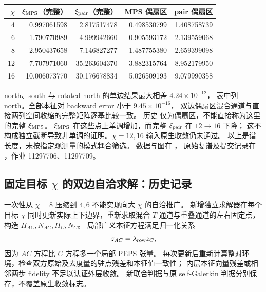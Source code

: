 \documentclass[11pt]{article}
\begin{document}
\begin{center}
\begin{tabular}{rrrrr}
\toprule
$\chi$ & $\xi_{\rm MPS}$（完整） & $\xi_{\rm pair}$（完整） & MPS 偶扇区 & pair 偶扇区\\
\midrule
4  & 0.997061598 & 2.817517478 & 0.498530799 & 1.408758739\\
6  & 1.790770989 & 4.999942660 & 0.905593172 & 2.139559068\\
8  & 2.950437658 & 7.146827277 & 1.487755380 & 2.659399098\\
12 & 7.707971060 & 35.263604370 & 3.882315764 & 8.952179950\\
16 & 10.006073770 & 30.176678834 & 5.026509193 & 9.079990358\\
\bottomrule
\end{tabular}
\end{center}
north、south 与 rotated-north 的单边结果最大相差 $4.24\times10^{-12}$，
表中列 north。全部本征对 backward error 小于 $9.45\times10^{-16}$，
双边偶扇区混合通道与直接两列空间收缩的完整矩阵逐基比较一致。
历史  仅为偶扇区，不能直接称为这里的完整 $\xi_{\rm MPS}$。
$\xi_{\rm MPS}$ 在这些点上单调增加，而完整 $\xi_{\rm pair}$ 在 $12\to16$ 下降；
这不构成独立截断导致非单调的证明。$\chi=12,16$ 输入原生收敛仍未通过。
以上是谱长度，未按指定观测量的模式耦合筛选。
数据与图在 ，
原始复谱及提交记录在 ，作业 11297706、11297709。




\subsection{固定目标 $\chi$ 的双边自洽求解：历史记录}

一次性从 $\chi=8$ 压缩到 $4,6$ 不能实现向大 $\chi$ 的自洽推广。
新增独立求解器在每个目标 $\chi$ 同时更新实际上下边界，重新求取混合
$T$ 通道与重叠通道的左右固定点，构造 $H_{AC},N_{AC},H_C,N_C$。
局部广义本征方程满足归一化关系
\begin{equation}
 z_{AC}=\lambda_{\rm row}z_C,
\end{equation}
因为 $AC$ 方程比 $C$ 方程多一个局部 PEPS 张量。
每次更新后重新计算整对环境，检查双方原始及去度量的驻点残差和本征值一致性；
内层本征向量残差或相邻两步 fidelity 不足以认证外层收敛。
新联合判据与原 self-Galerkin 判据分别保存，不覆盖原生收敛标志。
\end{document}
